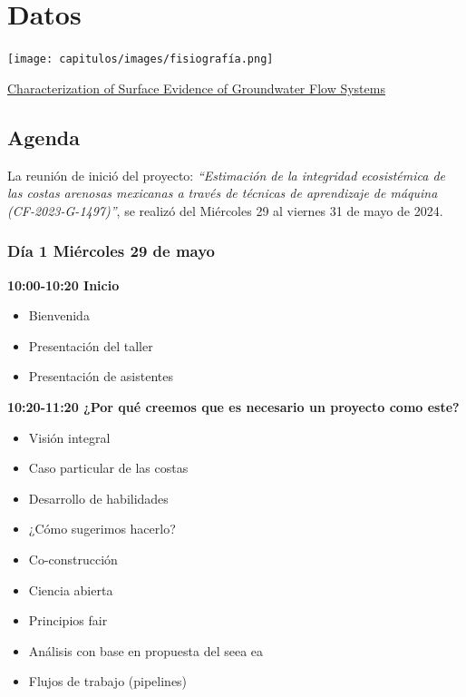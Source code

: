 \documentclass[
  letterpaper,
  DIV=11,
  numbers=noendperiod]{scrreprt}
\providecommand{\tightlist}{%
  \setlength{\itemsep}{0pt}\setlength{\parskip}{0pt}}\usepackage{longtable,booktabs,array}
\begin{document}

\hypertarget{datos}{%
\chapter{Datos}\label{datos}}

\texttt{[image: capitulos/images/fisiografía.png]}

\href{https://www.mdpi.com/2073-4441/12/9/2459}{Characterization of
Surface Evidence of Groundwater Flow Systems}

\hypertarget{agenda}{%
\section{Agenda}\label{agenda}}

La reunión de inició del proyecto: \emph{``Estimación de la integridad
ecosistémica de las costas arenosas mexicanas a través de técnicas de
aprendizaje de máquina (CF-2023-G-1497)''}, se realizó del Miércoles 29
al viernes 31 de mayo de 2024.

\hypertarget{duxeda-1-miuxe9rcoles-29-de-mayo}{%
\subsection{Día 1 Miércoles 29 de
mayo}\label{duxeda-1-miuxe9rcoles-29-de-mayo}}

\textbf{10:00-10:20 Inicio }

\begin{itemize}
\tightlist
\item
  Bienvenida
\item
  Presentación del taller
\item
  Presentación de asistentes
\end{itemize}

\textbf{10:20-11:20 ¿Por qué creemos que es necesario un proyecto como
este?}

\begin{itemize}
\tightlist
\item
  Visión integral
\item
  Caso particular de las costas
\item
  Desarrollo de habilidades
\item
  ¿Cómo sugerimos hacerlo?
\item
  Co-construcción
\item
  Ciencia abierta
\item
  Principios fair
\item
  Análisis con base en propuesta del seea ea
\item
  Flujos de trabajo (pipelines)
\end{itemize}
\end{document}
